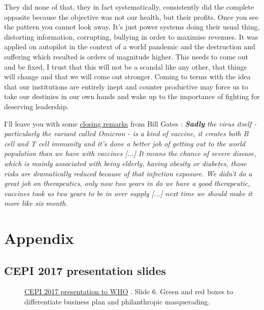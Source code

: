 \documentclass[11pt,a4paper,notitlepage]{report}
\begin{document}
They did none of that, they in fact systematically, consistently did the complete opposite because the objective was not our health, but their profits. Once you see the pattern you cannot look away. It's just power systems doing their usual thing, distorting information, corrupting, bullying in order to maximise revenues. It was applied on autopilot in the context of a world pandemic and the destruction and suffering which resulted is orders of magnitude higher. This needs to come out and be fixed, I trust that this will not be a scandal like any other, that things will change and that we will come out stronger. Coming to terms with the idea that our institutions are entirely inept and counter productive may force us to take our destinies in our own hands and wake up to the importance of fighting for deserving leadership.

I'll leave you with some \href{https://twitter.com/disclosetv/status/1494810193175195652}{closing remarks} from Bill Gates \cite{twitter19022022}: \textit{\textbf{Sadly} the virus itself - particularly the variant called Omicron - is a kind of vaccine, it creates both B cell and T cell immunity and it's done a better job of getting out to the world population than we have with vaccines [...] It means the chance of severe disease, which is mainly associated with being elderly, having obesity or diabetes, those risks are dramatically reduced because of that infection exposure. We didn't do a great job on therapeutics, only now two years in do we have a good therapeutic, vaccines took us two years to be in over supply [...] next time we should make it more like six month.}

\clearpage

\section*{Appendix}

\subsection*{CEPI 2017 presentation slides}

\begin{figure}[h]
    \centering
    \caption{\href{https://www.who.int/medicines/ebola-treatment/TheCoalitionEpidemicPreparednessInnovations-an-overview.pdf}{CEPI 2017 presentation to WHO} \cite{cepi072017}. Slide 6. Green and red boxes to differentiate business plan and philanthropic masquerading.}
    \label{fig:CEPI-slide-6}
\end{figure}
\end{document}
